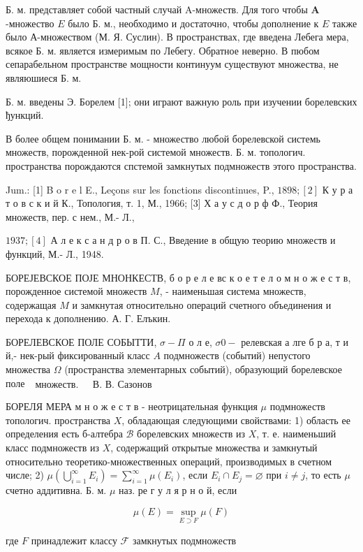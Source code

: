 \documentclass[10pt]{article}
\begin{document}
Б. м. представляет собой частный случай A-множеств. Для того чтобы $\boldsymbol{A}$-множество $E$ было Б. м., необходимо и достаточно, чтобы дополнение к $E$ также было А-множеством (М. Я. Суслин). В пространствах, где введена Лебега мера, всякое Б. м. является измеримым по Лебегу. Обратное неверно. В пюбом сепарабельном пространстве мощности континуум существуют множества, не являюшиеся Б. м.



Б. м. введены Э. Борелем [1]; они играют важную роль при изучении борелевских ђункций.



В более общем понимании Б. м. - множество любой борелевской системь множеств, порожденной нек-рой системой множеств. Б. м. топологич. пространства порождаются спстемой замкнутых подмножеств этого пространства.



Jum.: [1] B o r e l E., Leçons sur les fonctions discontinues, P., $1898 ;[2]$ К у р а т о в с к и й К., Топология, т. 1, М., 1966; [3] Х а у с д о р ф Ф., Теория множеств, пер. с нем., М.- Л.,

$1937 ;[4]$ А л е к с а н д р о в П. С., Введение в общую теорию множеств и функций, М.- Л., 1948.



БОРЕЈЕВСКОЕ ПОЈЕ МНОНКЕСТВ, б о р е л е вс к о е т е л о м н о ж е с т в, порожденное системой множеств $M$, - наименьшая система множеств, содержащая $M$ и замкнутая относительно операций счетного объединения и перехода к дополнению. А. Г. Елъкин.



БОРЕЛЕВСКОЕ ПОЛЕ СОБЫТТИ, $\sigma-\Pi$ о л е, $\sigma 0-$ релевская а лге б р а, т и й,- нек-рый фиксированный класс $A$ подмножеств (событий) непустого множества $\Omega$ (пространства элементарных событий), образующий борелевское поле $\begin{array}{ll}\text { множеств. } & \text { В. В. Сазонов }\end{array}$



БОРЕЛЯ МЕРА м н о ж е с т в - неотрицательная функция $\mu$ подмножеств топологич. пространства $X$, обладающая следующими свойствами: 1) область ее определения есть б-алтебра $\mathscr{B}$ борелевских множеств из $X$, т. е. наименьший класс подмножеств из $X$, содержащий открытые множества и замкнутый относительно теоретико-множественных операций, производимых в счетном числе; 2) $\mu\left(\bigcup_{i=1}^{\infty} E_{i}\right)=\sum_{i=1}^{\infty} \mu\left(E_{i}\right)$, если $E_{i} \cap E_{j}=\varnothing$ при $i \neq j$, то есть $\mu$ счетно аддитивна. Б. м. $\mu$ наз. ре г у л я р н о й, если



\[

\mu(E)=\sup _{E \supset F} \mu(F)

\]



где $F$ принадлежит классу $\mathcal{F}$ замкнутых подмножеств
\end{document}
